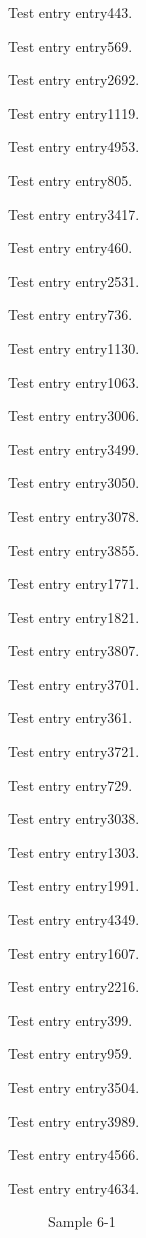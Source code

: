 Test entry \gls{entry443}.

Test entry \gls{entry569}.

Test entry \gls{entry2692}.

Test entry \gls{entry1119}.

Test entry \gls{entry4953}.

Test entry \gls{entry805}.

Test entry \gls{entry3417}.

Test entry \gls{entry460}.

Test entry \gls{entry2531}.

Test entry \gls{entry736}.

Test entry \gls{entry1130}.

Test entry \gls{entry1063}.

Test entry \gls{entry3006}.

Test entry \gls{entry3499}.

Test entry \gls{entry3050}.

Test entry \gls{entry3078}.

Test entry \gls{entry3855}.

Test entry \gls{entry1771}.

Test entry \gls{entry1821}.

Test entry \gls{entry3807}.

Test entry \gls{entry3701}.

Test entry \gls{entry361}.

Test entry \gls{entry3721}.

Test entry \gls{entry729}.

Test entry \gls{entry3038}.

Test entry \gls{entry1303}.

Test entry \gls{entry1991}.

Test entry \gls{entry4349}.

Test entry \gls{entry1607}.

Test entry \gls{entry2216}.

Test entry \gls{entry399}.

Test entry \gls{entry959}.

Test entry \gls{entry3504}.

Test entry \gls{entry3989}.

Test entry \gls{entry4566}.

Test entry \gls{entry4634}.

\begin{figure}[tbhp]
\caption{Sample 6-1}
\label{fig:sample-6-1}
\end{figure}

